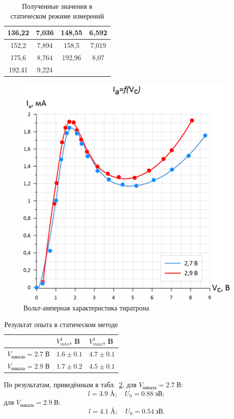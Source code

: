 \documentclass[a4paper, 12pt]{article}
\begin{document}
\begin{table}[h!]
\begin{center}
\begin{tabular}{|cc|cc|}
\multicolumn{1}{|c|}{136,22}       & 7,036     & \multicolumn{1}{c|}{148,55}       & 6,592     \\ \hline
\multicolumn{1}{|c|}{152,2}        & 7,894     & \multicolumn{1}{c|}{158,5}        & 7,019     \\ \hline
\multicolumn{1}{|c|}{175,6}        & 8,764     & \multicolumn{1}{c|}{192,96}       & 8,07      \\ \hline
\multicolumn{1}{|c|}{192,41}       & 9,224     & \multicolumn{1}{c|}{}             &           \\ \hline
\end{tabular}
\end{center}
\caption{Полученные значения в статическом режиме измерений}
\label{tab:static}
\end{table}

\newpage

\begin{figure}[h!]
\begin{center}
    \includegraphics[width=0.6\linewidth]{plot1.png}
\end{center}
\caption{Вольт-амперная характеристика тиратрона}
\label{fig:plot}
\end{figure}

\begin{table}[h!]
	\centering
	\begin{tabular}{|l|l|l|}
	\hline
		                      & $V^1_{min}$, B        & $V^1_{max}$, B      \\ 		\hline
		$V_{накала} = 2.7\; В$ & $1.6\pm 0.1$ & $4.7\pm 0.1$ \\ 			\hline
		$V_{накала} = 2.9\; В$ & $1.7\pm 0.2$ & $4.5\pm 0.1$ \\ 			\hline
	\end{tabular}
	\caption{Результат опыта в статическом методе}
	\label{tab:stat}
\end{table}
По результатам, приведённым в табл.~\ref{tab:stat}, для $V_{накала} = 2.7\; В$:
\[
	l = 3.9 \; \text{\AA{}}; \quad U_0 = 0.88~эВ;
\]
для $V_{накала} = 2.9\; В$:
\[
	l = 4.1 \; \text{\AA{}}; \quad U_0 = 0.54~эВ.
\]
\end{document}
